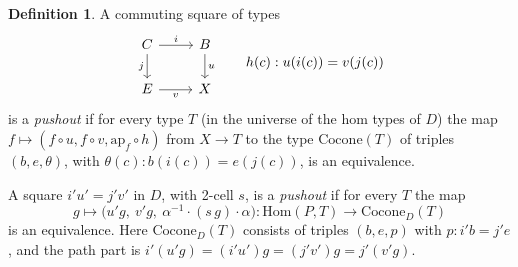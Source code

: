 \documentclass[11pt]{amsart}
\numberwithin{equation}{section}
\theoremstyle{definition}
\newtheorem{definition}[theorem]{Definition}
\theoremstyle{remark}
\newcommand{\Hom}{\mathrm{Hom}}
\newcommand{\Cocone}{\mathrm{Cocone}}
\begin{document}
\begin{definition}
A commuting square of types
\[\begin{tikzcd} C\ar[r,"i"]\ar[d,"j"'] & B\ar[d,"u"]\\ E\ar[r,"v"'] & X
\end{tikzcd}\qquad h(c): u(i(c))=v(j(c))\]
is a \emph{pushout} if for every type $T$ (in the universe of the hom types of
$D$) the map
$f\mapsto (f\circ u, f\circ v, \mathrm{ap}_f\circ h)$ from $X\to T$ to the type
$\Cocone(T)$ of triples $(b,e,\theta)$, with
$\theta(c):b(i(c))=e(j(c))$, is an equivalence.

A square $i'u'=j'v'$ in $D$, with 2-cell $s$, is a \emph{pushout} if for every
$T$ the map
\[ g\mapsto \big(u'g,\ v'g,\ \alpha^{-1}\cdot (s\,g)\cdot\alpha\big) :
  \Hom(P,T)\to \Cocone_D(T) \]
is an equivalence. Here $\Cocone_D(T)$ consists of triples $(b,e,p)$ with
$p:i'b=j'e$, and the path part is
$i'(u'g)=(i'u')g=(j'v')g=j'(v'g)$.
\end{definition}
\end{document}
